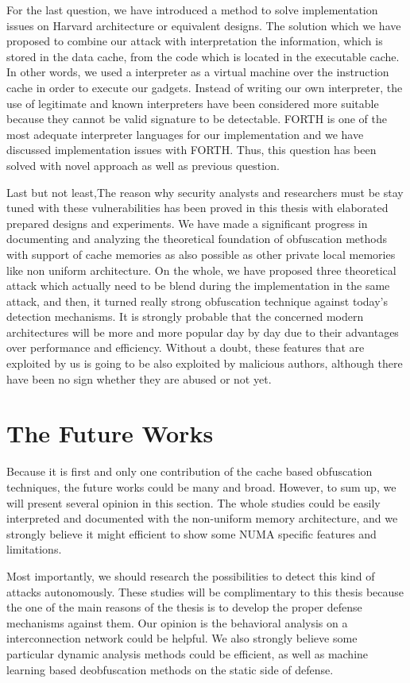 For the last question, we have introduced a method to solve implementation issues on Harvard architecture or equivalent designs. The solution which we have proposed to combine our attack with interpretation the information, which is stored in the data cache, from the code which is located in the executable cache. In other words, we used a interpreter as a virtual machine over the instruction cache in order to execute our gadgets. Instead of writing our own interpreter, the use of legitimate and known interpreters have been considered more suitable because they cannot be valid signature to be detectable. FORTH is one of the most adequate interpreter languages for our implementation and we have discussed implementation issues with FORTH. Thus, this question has been solved with novel approach as well as previous question.

Last but not least,The reason why security analysts and researchers must be stay tuned with these vulnerabilities has been proved in this thesis with elaborated prepared designs and experiments. We have made a significant progress in documenting and analyzing the theoretical foundation of obfuscation methods with support of cache memories as also possible as other private local memories like non uniform architecture. On the whole, we have proposed three theoretical attack which actually need to be blend during the implementation in the same attack, and then, it turned really strong obfuscation technique against today's detection mechanisms. It is strongly probable that the concerned modern architectures will be more and more popular day by day due to their advantages over performance and efficiency. Without a doubt, these features that are exploited by us is going to be also exploited by malicious authors, although there have been no sign whether they are abused or not yet.

\section*{The Future Works}

Because it is first and only one contribution of the cache based obfuscation techniques, the future works could be many and broad. However, to sum up, we will present several opinion in this section. The whole studies could be easily interpreted and documented with the non-uniform memory architecture, and we strongly believe it might efficient to show some NUMA specific features and limitations. 

Most importantly, we should research the possibilities to detect this kind of attacks autonomously. These studies will be complimentary to this thesis because the one of the main reasons of the thesis is to develop the proper defense mechanisms against them. Our opinion is the behavioral analysis on a interconnection network could be helpful. We also strongly believe some particular dynamic analysis methods could be efficient, as well as machine learning based deobfuscation methods on the static side of defense. 

